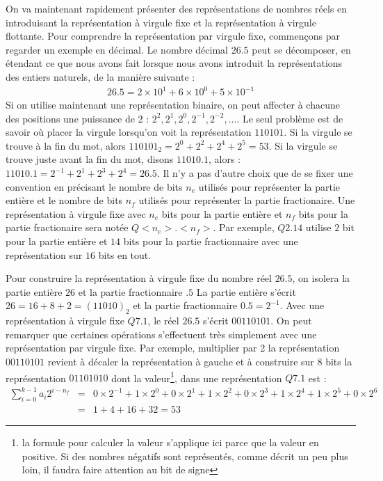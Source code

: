 On va maintenant rapidement présenter des représentations de nombres réels en introduisant la représentation à virgule fixe et la représentation à virgule flottante. Pour comprendre la représentation par virgule fixe, commençons par regarder un exemple en décimal. Le nombre décimal $26.5$ peut se décomposer, en étendant ce que nous avons fait lorsque nous avons introduit la représentations des entiers naturels, de la manière suivante :
\begin{eqnarray*}
26.5 = 2 \times 10^1 + 6 \times 10^0 + 5 \times 10^{-1}
\end{eqnarray*}
Si on utilise maintenant une représentation binaire, on peut affecter à chacune des positions une puissance de $2$ : $2^2, 2^1, 2^0, 2^{-1}, 2^{-2}, ...$. Le seul problème est de savoir o{\`u} placer la virgule lorsqu'on voit la représentation $110101$. Si la virgule se trouve à la fin du mot, alors $110101_2 = 2^0 + 2^2 + 2^4 + 2^5 = 53$. Si la virgule se trouve juste avant la fin du mot, disons $11010.1$, alors : $11010.1 = 2^{-1} + 2^1 + 2^3 + 2^4 = 26.5$. Il n'y a pas d'autre choix que de se fixer une convention en précisant le nombre de bits $n_e$ utilisés pour représenter la partie entière et le nombre de bits $n_f$ utilisés pour représenter la partie fractionaire. Une représentation à virgule fixe avec $n_e$ bits pour la partie entière et $n_f$ bits pour la partie fractionaire sera notée $Q<n_e>.<n_f>$. Par exemple, $Q2.14$ utilise $2$ bit pour la partie entière et $14$ bits pour la partie fractionnaire avec une représentation sur $16$ bits en tout.

Pour construire la représentation à virgule fixe du nombre réel $26.5$, on isolera la partie entière $26$ et la partie fractionnaire $.5$ La partie entière s'écrit $26 = 16 + 8 + 2 = (11010)_2$ et la partie fractionnaire $0.5 = 2^{-1}$. Avec une représentation à virgule fixe $Q7.1$, le réel $26.5$ s'écrit $00110101$. On peut remarquer que certaines opérations s'effectuent très simplement avec une représentation par virgule fixe. Par exemple, multiplier par 2 la représentation $00110101$ revient à décaler la représentation à gauche et à construire sur $8$ bits la représentation $01101010$ dont la valeur\footnote{la formule pour calculer la valeur s'applique ici parce que la valeur en positive. Si des nombres négatifs sont représentés, comme décrit un peu plus loin, il faudra faire attention au bit de signe}, dans une représentation $Q7.1$ est :
\begin{eqnarray*}
\sum_{i=0}^{k-1} a_i 2^{i-n_f} &=& 0\times 2^{-1} + 1 \times 2^0 + 0 \times 2^1 + 1 \times 2^2 + 0 \times 2^3 + 1 \times 2^4 + 1 \times 2^5 + 0 \times 2^6\\
 &=& 1 + 4 + 16 + 32 = 53
\end{eqnarray*}

